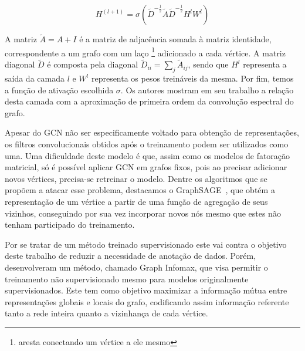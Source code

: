 \begin{equation} \label{eq:gcn_layer}
    H^{(l+1)} = \sigma (\tilde{D}^{-\frac{1}{2}} \tilde{A} \tilde{D}^{-\frac{1}{2}} H^l W^l)
\end{equation}

A matriz $\tilde{A} = A + I$ é a matriz de adjacência somada à matriz
identidade, correspondente a um grafo com um laço \footnote{aresta conectando um
vértice a ele mesmo} adicionado a cada vértice.
A matriz diagonal $\tilde{D}$ é composta pela diagonal
$\tilde{D}_{ii} = \sum_{j}\tilde{A}_{ij}$, sendo que $H^l$ representa a saída da
camada $l$ e $W^l$ representa os pesos treináveis da mesma.
Por fim, temos a função de ativação escolhida $\sigma$.
Os autores mostram em seu trabalho a relação desta camada com a aproximação de
primeira ordem da convolução espectral do grafo.

Apesar do GCN não ser especificamente voltado para obtenção de representações,
os filtros convolucionais obtidos após o treinamento podem ser utilizados como
uma.
Uma dificuldade deste modelo é que, assim como os modelos de fatoração matricial,
só é possível aplicar GCN em grafos fixos, pois ao precisar adicionar novos vértices,
precisa-se retreinar o modelo.
Dentre os algoritmos que se propõem a atacar esse problema, destacamos o
GraphSAGE~\cite{hamilton17}, que obtém a representação de um vértice a partir
de uma função de agregação de seus vizinhos, conseguindo por sua vez incorporar
novos nós mesmo que estes não tenham participado do treinamento.

Por se tratar de um método treinado supervisionado este vai contra o
objetivo deste trabalho de reduzir a necessidade de anotação de dados.
Porém, \citet{velickovic18} desenvolveram um método, chamado Graph Infomax, que
visa permitir o treinamento não supervisionado mesmo para modelos originalmente
supervisionados.
Este tem como objetivo maximizar a informação mútua entre representações globais e
locais do grafo, codificando assim informação referente tanto a rede inteira
quanto a vizinhança de cada vértice.
